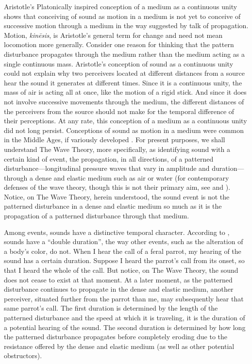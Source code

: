 Aristotle's Platonically inspired conception of a medium as a continuous unity shows that conceiving of sound as motion in a medium is not yet to conceive of successive motion through a medium in the way suggested by talk of propagation. Motion, \emph{kinēsis}, is Aristotle's general term for change and need not mean locomotion more generally. Consider one reason for thinking that the pattern disturbance propagates through the medium rather than the medium acting as a single continuous mass. Aristotle's conception of sound as a continuous unity could not explain why two perceivers located at different distances from a source hear the sound it generates at different times. Since it is a continuous unity, the mass of air is acting all at once, like the motion of a rigid stick. And since it does not involve successive movements through the medium, the different distances of the perceivers from the source should not make for the temporal difference of their perceptions. At any rate, this conception of a medium as a continuous unity did not long persist. Conceptions of sound as motion in a medium were common in the Middle Ages, if variously developed \citep{Pasnau:2000aa}. For present purposes, we shall understand The Wave Theory, more specifically, as identifying sound with a certain kind of event, the propagation, in all directions, of a patterned disturbance---longitudinal pressure waves that vary in amplitude and duration---through a dense and elastic medium such as air or water (for contemporary defenses of the wave theory, though this is not their primary aim, see \citealt{OShaughnessy:2009aa} and \citealt{Sorensen:2009aa}). Notice, on The Wave Theory, herein understood, the sound event is not the patterned disturbance in a dense and elastic medium so much as it is the propagation of a patterned disturbance through that medium. 

Among events, sounds have a distinctive temporal character. According to \citet{OShaughnessy:2009aa}, sounds have a ``double duration'', the way other events, such as the alteration of a body's color, do not. When I hear the call of a feral parrot, my hearing of the sound has a certain duration. Suppose I heard the parrot's call from its onset, so that I heard the whole of the call. But notice, on The Wave Theory, the sound does not cease to exist at that moment. At a later moment, as the patterned disturbance continues to propagate in the dense and elastic medium, another perceiver, situated further from the parrot than me, may subsequently hear that same parrot's call. The first duration is determined by the length of the patterned disturbance and the speed at which it is traveling, it is the duration of a potential hearing of the sound. The second duration is determined by how long the patterned disturbance propagates before completely eroding due to the resistance offered by the dense and elastic medium (as well as other potential obstructors).

